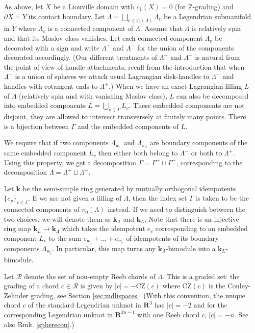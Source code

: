 \documentclass{gtpart}
\renewcommand{\k}{\mathbf{k}}
\renewcommand{\Z}{\mathbb{Z}}
\renewcommand{\R}{\mathbf{R}}
\begin{document}
As above, let $X$ be a Liouville domain with $c_1(X)=0$ (for $\Z$-grading) and $\partial X = Y$ its contact boundary. Let     $\Lambda =
\bigsqcup_{v \in \pi_0(\Lambda)} \Lambda_v$ be a Legendrian submanifold in $Y$ where $\Lambda_v$ is a connected
component of $\Lambda$. Assume that $\Lambda$ is relatively spin and that its Maslov class vanishes. Let each connected component $\Lambda_{v}$ be decorated with a sign and
write $\Lambda^{+}$ and $\Lambda^{-}$ for the union of the components decorated accordingly. (Our
different treatments of $\Lambda^{+}$ and $\Lambda^{-}$ is natural from the point of view of handle
attachments; recall from the introduction that when $\Lambda^{-}$ is a union of
spheres we attach usual Lagrangian disk-handles to $\Lambda^{-}$ and handles with cotangent ends to
$\Lambda^{+}$.)
When we have an exact Lagrangian filling $L$ of $\Lambda$ (relatively spin and with
vanishing Maslov class), $L$
can also be decomposed into embedded components $L = \bigcup_{v \in \Gamma} L_v$. These embedded components are
not disjoint, they are allowed to intersect transversely at finitely many points. There is a
bijection between $\Gamma$ and the embedded components of $L$.

We require that if two components $\Lambda_{w_{1}}$ and $\Lambda_{w_{2}}$ are boundary components of the same embedded component $L_{v}$ then either both belong to $\Lambda^{-}$ or both to $\Lambda^{+}$. Using this property, we get a decomposition $\Gamma =
\Gamma^+ \sqcup \Gamma^-$, corresponding to the decomposition $\Lambda = \Lambda^+ \sqcup \Lambda^-$. 

Let $\k$ be the semi-simple ring generated by mutually orthogonal idempotents
$\{ e_v \}_{v \in \Gamma}$. If we are not given a filling of $\Lambda$, then
the index set $\Gamma$ is taken to be the connected components of $\pi_0(\Lambda)$ instead. If we need
to distinguish between the two choices, we will denote them as $\k_{\Lambda}$ and $\k_{L}$. Note that there is an injective ring map $\k_{L} \to \k_{\Lambda}$ which takes the idempotent $e_{v}$ corresponding to an embedded component $L_{v}$ to the sum $e_{w_{1}}+\dots+e_{w_{r}}$ of idempotents of its boundary components $\Lambda_{w_{j}}$. In particular, this map turns any $\k_{\Lambda}$-bimodule into a $\k_{L}$-bimodule.


Let $\mathcal{R}$ denote the set of non-empty Reeb chords of $\Lambda$. This is a graded set: the grading of a
chord $c \in \mathcal{R}$ is given by $|c| = -\mathrm{CZ}(c)$ where $\mathrm{CZ}(c)$ is the Conley-Zehnder grading, see Section \ref{sec:mdlispaces}.
(With this convention, the unique chord $c$ of the standard Legendrian unknot in
$\R^3$ has $|c|=-2$ and for the corresponding Legendrian unknot in $\R^{2n-1}$ with one Reeb chord
$c$, $|c|=-n$. See also Rmk. \ref{spherecon}.) 
\end{document}
